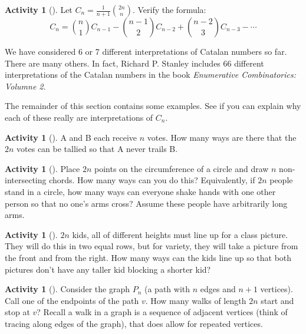\documentclass[10pt,]{book}
\theoremstyle{plain}
\theoremstyle{definition}
\theoremstyle{definition}
\theoremstyle{definition}
\newtheorem{activity}[project]{Activity}
\numberwithin{equation}{chapter}
\begin{document}
\begin{activity}[]\label{activity-181}
\hypertarget{p-1048}{}%
Let \(C_{n} = \frac{1}{n + 1}\binom{2n}{n}\). Verify the formula:%
\begin{equation*}
C_{n} = \binom{n}{1} C_{n - 1} - \binom{n - 1}{2} C_{n - 2} + \binom{n - 2}{3} C_{n - 3} - \cdots
\end{equation*}
%
\end{activity}
\hypertarget{p-1049}{}%
We have considered 6 or 7 different interpretations of Catalan numbers so far.  There are many others.  In fact, Richard P. Stanley includes 66 different interpretations of the Catalan numbers in the book \emph{Enumerative Combinatorics: Volumne 2}.%
\par
\hypertarget{p-1050}{}%
The remainder of this section contains some examples.  See if you can explain why each of these really are interpretations of \(C_n\).%
\begin{activity}[]\label{activity-182}
\hypertarget{p-1051}{}%
A and B each receive \(n\) votes. How many ways are there that the \(2n\) votes can be tallied so that A never trails B.%
\end{activity}
\begin{activity}[]\label{activity-183}
\hypertarget{p-1052}{}%
Place \(2n\) points on the circumference of a circle and draw \(n\)  non-intersecting chords.  How many ways can you do this?  Equivalently, if \(2n\) people stand in a circle, how many ways can everyone shake hands with one other person so that no one's arms cross?  Assume these people have arbitrarily long arms.%
\end{activity}
\begin{activity}[]\label{activity-184}
\hypertarget{p-1053}{}%
\(2n\) kids, all of different heights must line up for a class picture.  They will do this in two equal rows, but for variety, they will take a picture from the front and from the right.  How many ways can the kids line up so that both pictures don't have any taller kid blocking a shorter kid?%
\end{activity}
\begin{activity}[]\label{activity-185}
\hypertarget{p-1054}{}%
Consider the graph \(P_n\) (a path with \(n\) edges and \(n+1\) vertices).  Call one of the endpoints of the path \(v\).  How many walks of length \(2n\) start and stop at \(v\)?  Recall a walk in a graph is a sequence of adjacent vertices (think of tracing along edges of the graph), that does allow for repeated vertices.%
\end{activity}
\end{document}
